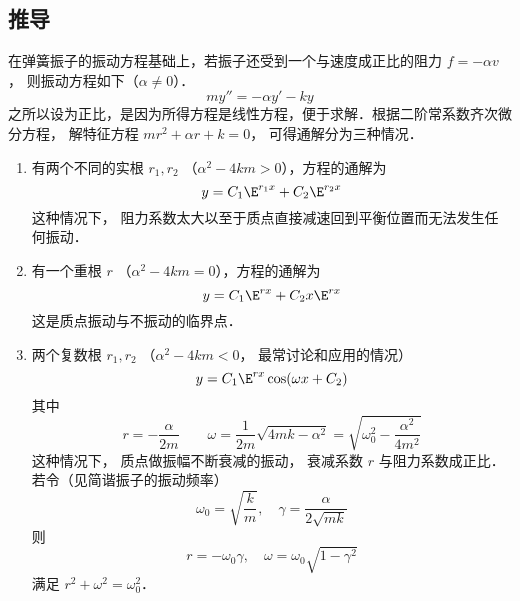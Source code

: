 \subsection{推导}
在弹簧振子的振动方程基础上，若振子还受到一个与速度成正比的阻力 $f =  - \alpha v$， 则振动方程如下（$\alpha \ne 0$）．
\begin{equation}
my'' =  - \alpha y' - ky
\end{equation}
之所以设为正比，是因为所得方程是线性方程，便于求解．根据二阶常系数齐次微分方程， 解特征方程 $m r^2 + \alpha r + k = 0$， 可得通解分为三种情况．
\begin{enumerate}
\item 有两个不同的实根 $r_1, r_2$ （$\alpha ^2 - 4km > 0$），方程的通解为
\begin{equation}
y = C_1 \E^{r_1 x} + C_2 \E^{r_2 x}
\end{equation}
这种情况下， 阻力系数太大以至于质点直接减速回到平衡位置而无法发生任何振动．

\item 有一个重根 $r$ （$\alpha ^2 - 4km = 0$），方程的通解为
\begin{equation}
y = C_1 \E^{rx} + C_2 x \E^{rx}
\end{equation}
这是质点振动与不振动的临界点．

\item 两个复数根 $r_1,r_2$ （$\alpha ^2 - 4km < 0$， 最常讨论和应用的情况）
\begin{equation}
y = C_1 \E^{rx}\cos(\omega x + C_2)
\end{equation}
其中
\begin{equation}
r =  - \frac{\alpha }{2m}
\qquad
\omega = \frac{1}{2m}\sqrt {4mk - \alpha ^2}  = \sqrt{\omega_0^2 - \frac{\alpha ^2}{4 m^2}}
\end{equation}
这种情况下， 质点做振幅不断衰减的振动， 衰减系数 $r$ 与阻力系数成正比． 若令（见简谐振子的振动频率）
\begin{equation}
\omega_0 = \sqrt{\frac{k}{m}}, \quad \gamma  = \frac{\alpha }{2\sqrt{mk}}
\end{equation}
则 
\begin{equation}
r =  - \omega_0 \gamma,\quad \omega  = \omega_0 \sqrt{1 - \gamma ^2}
\end{equation}
满足
$r^2 + \omega ^2 = \omega_0^2$．
\end{enumerate}


